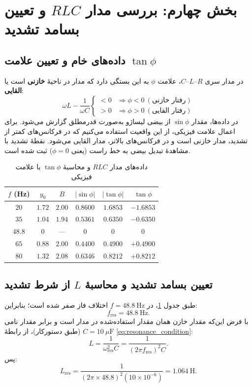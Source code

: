 \documentclass[a4paper, 11pt]{article}
\begin{document}
\section{بخش چهارم: بررسی مدار $RLC$ و تعیین بسامد تشدید}

\subsection{داده‌های خام و تعیین علامت \(\tan\phi\)}

در مدار سری \(R\)–\(L\)–\(C\)، علامت \(\phi\) به این بستگی دارد که مدار در ناحیهٔ \textbf{خازنی} است یا \textbf{القایی}:
\[
\omega L-\frac{1}{\omega C}
\begin{cases}
<0 & \Rightarrow \phi<0 \ (\text{رفتار خازنی})\\
>0 & \Rightarrow \phi>0 \ (\text{رفتار القایی})
\end{cases}
\]
در داده‌ها، مقدار \(\sin\phi\) از بیضی لیساژو به‌صورت قدرمطلق گزارش می‌شود. برای اعمال علامت فیزیکی، از این واقعیت استفاده می‌کنیم که در فرکانس‌های کمتر از تشدید، مدار خازنی است و در فرکانس‌های بالاتر، مدار القایی می‌شود. نقطهٔ تشدید با مشاهدهٔ تبدیل بیضی به خط راست (یعنی \(\phi=0\)) ثبت شده است.

\begin{table}[h!]
\caption{داده‌های مدار $RLC$ و محاسبهٔ \(\tan\phi\) با علامت فیزیکی}
\label{tab:RLC_raw}
\centering
\begin{tabular}{cccccc}
\toprule
$f$ (Hz) & $y_0$ & $B$ & $|\sin\phi|$ & $|\tan\phi|$ & $\tan\phi$\\
\midrule
$20$  & $1.72$ & $2.00$ & $0.8600$ & $1.6853$ & $-1.6853$ \\
$35$  & $1.04$ & $1.94$ & $0.5361$ & $0.6350$ & $-0.6350$ \\
$48.8$& $0$    &  ---   & $0$      & $0$      & $0$ \\
$65$  & $0.88$ & $2.00$ & $0.4400$ & $0.4900$ & $+0.4900$ \\
$80$  & $1.32$ & $2.08$ & $0.6346$ & $0.8212$ & $+0.8212$ \\
\bottomrule
\end{tabular}
\end{table}

\subsection{تعیین بسامد تشدید و محاسبهٔ $L$ از شرط تشدید}

طبق جدول \ref{tab:RLC_raw}، در \(f=48.8~\mathrm{Hz}\) اختلاف فاز صفر شده است؛ بنابراین:
\[
f_{\mathrm{res}}=48.8~\mathrm{Hz}.
\]
با فرض این‌که مقدار خازن همان مقدار استفاده‌شده در مدار است و برابر مقدار نامی \(C=10~\mu\mathrm{F}\) (طبق دستورکار)، از رابطهٔ \eqref{eq:resonance_condition}:
\[
L=\frac{1}{\omega_{\mathrm{res}}^2 C}=\frac{1}{(2\pi f_{\mathrm{res}})^2 C}.
\]
پس:
\[
L_{\mathrm{res}}=\frac{1}{(2\pi\times 48.8)^2(10\times10^{-6})}=1.064\ \mathrm{H}.
\]
\end{document}
